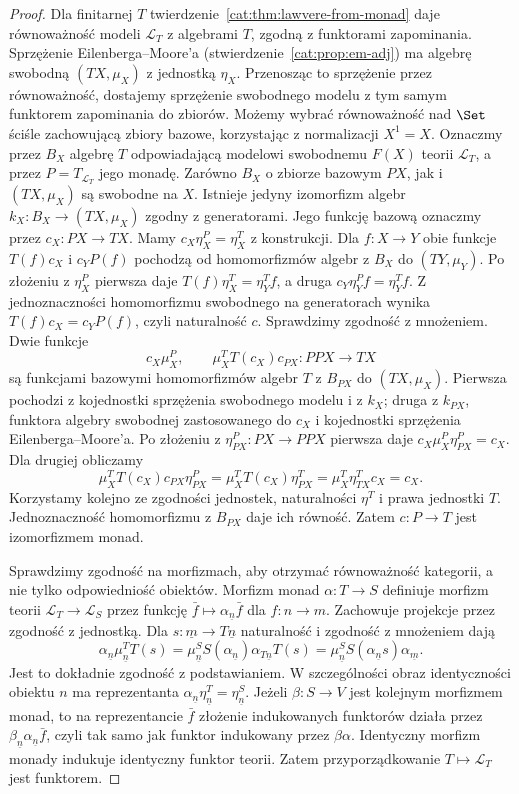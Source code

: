 \begin{proof}
Dla finitarnej $T$ twierdzenie~\ref{cat:thm:lawvere-from-monad} daje równoważność modeli $\mathcal L_T$ z algebrami $T$, zgodną z funktorami zapominania. Sprzężenie Eilenberga--Moore'a (stwierdzenie~\ref{cat:prop:em-adj}) ma algebrę swobodną $(TX,\mu_X)$ z jednostką $\eta_X$. Przenosząc to sprzężenie przez równoważność, dostajemy sprzężenie swobodnego modelu z tym samym funktorem zapominania do zbiorów. Możemy wybrać równoważność nad $\Set$ ściśle zachowującą zbiory bazowe, korzystając z normalizacji $X^1=X$. Oznaczmy przez $B_X$ algebrę $T$ odpowiadającą modelowi swobodnemu $F(X)$ teorii $\mathcal L_T$, a przez $P=T_{\mathcal L_T}$ jego monadę. Zarówno $B_X$ o zbiorze bazowym $PX$, jak i $(TX,\mu_X)$ są swobodne na $X$. Istnieje jedyny izomorfizm algebr $k_X:B_X\to(TX,\mu_X)$ zgodny z generatorami. Jego funkcję bazową oznaczmy przez $c_X:PX\to TX$. Mamy $c_X\eta^P_X=\eta^T_X$ z konstrukcji. Dla $f:X\to Y$ obie funkcje $T(f)c_X$ i $c_YP(f)$ pochodzą od homomorfizmów algebr z $B_X$ do $(TY,\mu_Y)$. Po złożeniu z $\eta^P_X$ pierwsza daje $T(f)\eta^T_X=\eta^T_Yf$, a druga $c_Y\eta^P_Yf=\eta^T_Yf$. Z jednoznaczności homomorfizmu swobodnego na generatorach wynika $T(f)c_X=c_YP(f)$, czyli naturalność $c$. Sprawdzimy zgodność z mnożeniem. Dwie funkcje
\[
 c_X\mu^P_X,\qquad
 \mu_X^T T(c_X)c_{PX}:PPX\longrightarrow TX
\]
są funkcjami bazowymi homomorfizmów algebr $T$ z $B_{PX}$ do $(TX,\mu_X)$. Pierwsza pochodzi z kojednostki sprzężenia swobodnego modelu i z $k_X$; druga z $k_{PX}$, funktora algebry swobodnej zastosowanego do $c_X$ i kojednostki sprzężenia Eilenberga--Moore'a. Po złożeniu z $\eta^P_{PX}:PX\to PPX$ pierwsza daje $c_X\mu^P_X\eta^P_{PX}=c_X$. Dla drugiej obliczamy
\[
 \mu^T_X T(c_X)c_{PX}\eta^P_{PX}
 =\mu^T_X T(c_X)\eta^T_{PX}
 =\mu^T_X\eta^T_{TX}c_X=c_X.
\]
Korzystamy kolejno ze zgodności jednostek, naturalności $\eta^T$ i prawa jednostki $T$. Jednoznaczność homomorfizmu z $B_{PX}$ daje ich równość. Zatem $c:P\to T$ jest izomorfizmem monad.

Sprawdzimy zgodność na morfizmach, aby otrzymać równoważność kategorii, a nie tylko odpowiedniość obiektów. Morfizm monad $\alpha:T\to S$ definiuje morfizm teorii $\mathcal L_T\to\mathcal L_S$ przez funkcję $\bar f\mapsto\alpha_{\underline n}\bar f$ dla $f:n\to m$. Zachowuje projekcje przez zgodność z jednostką. Dla $s:\underline m\to T\underline n$ naturalność i zgodność z mnożeniem dają
\begin{equation}\label{cat:eq:lawvere-monad-morphism-subst}
 \alpha_{\underline n}\mu^T_{\underline n}T(s)
 =\mu^S_{\underline n}S(\alpha_{\underline n})\alpha_{T\underline n}T(s)
 =\mu^S_{\underline n}S(\alpha_{\underline n}s)\alpha_{\underline m}.
\end{equation}
Jest to dokładnie zgodność z podstawianiem. W szczególności obraz identyczności obiektu $n$ ma reprezentanta $\alpha_{\underline n}\eta^T_{\underline n}=\eta^S_{\underline n}$. Jeżeli $\beta:S\to V$ jest kolejnym morfizmem monad, to na reprezentancie $\bar f$ złożenie indukowanych funktorów działa przez $\beta_{\underline n}\alpha_{\underline n}\bar f$, czyli tak samo jak funktor indukowany przez $\beta\alpha$. Identyczny morfizm monady indukuje identyczny funktor teorii. Zatem przyporządkowanie $T\mapsto\mathcal L_T$ jest funktorem.


\end{proof}
